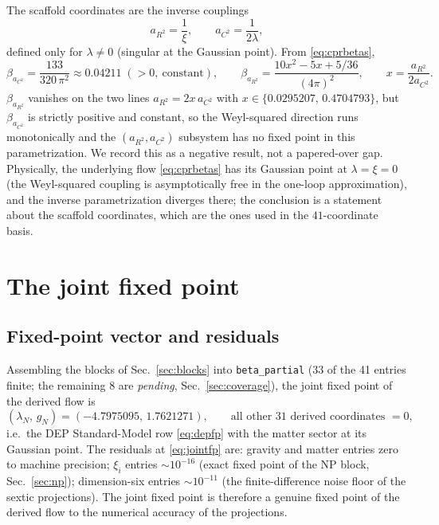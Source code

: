 \documentclass[11pt]{article}
\begin{document}
The scaffold coordinates are the inverse couplings
\begin{equation}
  \label{eq:scaffoldr2}
  a_{R^2}=\frac{1}{\xi},\qquad a_{C^2}=\frac{1}{2\lambda},
\end{equation}
defined only for $\lambda\neq 0$ (singular at the Gaussian point).  From
\eqref{eq:cprbetas},
\begin{equation}
  \label{eq:scaffoldbetas}
  \beta_{a_{C^2}}=\frac{133}{320\,\pi^2}\approx 0.04211\;(>0,\ \text{constant}),
  \qquad
  \beta_{a_{R^2}}=\frac{10x^2-5x+5/36}{(4\pi)^2},\qquad
  x=\frac{a_{R^2}}{2a_{C^2}}.
\end{equation}
$\beta_{a_{R^2}}$ vanishes on the two lines $a_{R^2}=2x\,a_{C^2}$ with
$x\in\{0.0295207,\,0.4704793\}$, but $\beta_{a_{C^2}}$ is strictly positive
and constant, so the Weyl-squared direction runs monotonically and the
$(a_{R^2},a_{C^2})$ subsystem has no fixed point in this parametrization.  We
record this as a negative result, not a papered-over gap.  Physically, the
underlying flow \eqref{eq:cprbetas} has its Gaussian point at
$\lambda=\xi=0$ (the Weyl-squared coupling is asymptotically free in the
one-loop approximation), and the inverse parametrization diverges there; the
conclusion is a statement about the scaffold coordinates, which are the ones
used in the $41$-coordinate basis.

\section{The joint fixed point}
\label{sec:joint}

\subsection{Fixed-point vector and residuals}
\label{sec:fpvector}

Assembling the blocks of Sec.~\ref{sec:blocks} into
\texttt{beta\_partial} (33 of the 41 entries finite; the remaining 8 are
\emph{pending}, Sec.~\ref{sec:coverage}), the joint fixed point of the
derived flow is
\begin{equation}
  \label{eq:jointfp}
  (\lambda_N,\,g_N)=(-4.7975095,\,1.7621271),
  \qquad
  \text{all other 31 derived coordinates }=0,
\end{equation}
i.e.\ the DEP Standard-Model row \eqref{eq:depfp} with the matter sector at
its Gaussian point.  The residuals at \eqref{eq:jointfp} are: gravity and
matter entries zero to machine precision; $\xi_i$ entries $\sim 10^{-16}$
(exact fixed point of the NP block, Sec.~\ref{sec:np}); dimension-six entries
$\sim 10^{-11}$ (the finite-difference noise floor of the sextic
projections).  The joint fixed point is therefore a genuine fixed point of
the derived flow to the numerical accuracy of the projections.
\end{document}
